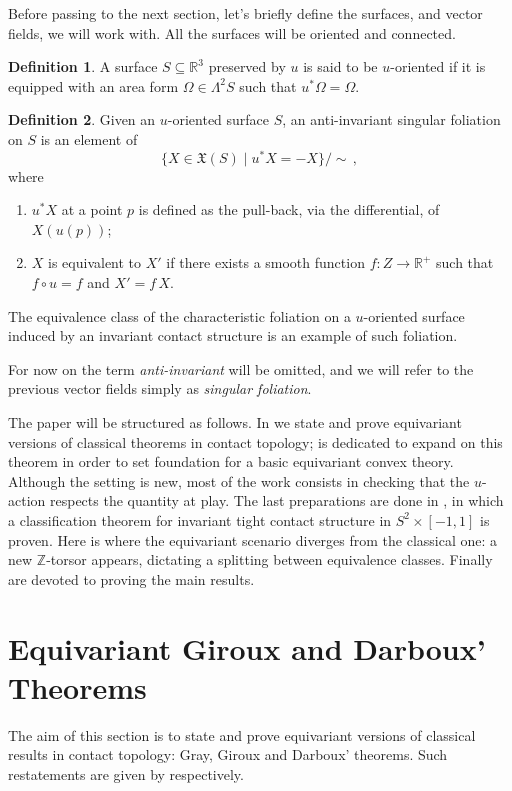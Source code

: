 \documentclass[a4paper, 11pt]{amsart}
\theoremstyle{plain}
\theoremstyle{definition}
\newtheorem*{definsn}{Definition}
\newcommand{\R}{\mathbb{R}}
\newcommand{\XX}{\mathfrak{X}}
\newcommand{\Z}{\mathbb{Z}}
\begin{document}
Before passing to the next section, let's briefly define the surfaces, and vector fields, we will work with. All the surfaces will be oriented and connected.
\begin{definsn}
	A surface $S \subseteq \R^3$ preserved by $u$ is said to be $u$-oriented if it is equipped with an area form $\Omega \in \Lambda^2S$ such that $u^*\Omega = \Omega$.
\end{definsn}
\begin{definsn}
	Given an $u$-oriented surface $S$, an anti-invariant singular foliation on $S$ is an element of
	\[
		\{X \in \XX(S) \mid u^*X = -X\}/\sim\,,
	\]
	where
	\begin{enumerate}
		\item $u^*X$ at a point $p$ is defined as the pull-back, via the differential, of $X(u(p))$;
		\item $X$ is equivalent to $X'$ if there exists a smooth function $f \colon Z \to \R^+$ such that $f \circ u = f$ and $X' = f\,X$.
	\end{enumerate}
\end{definsn}
The equivalence class of the characteristic foliation on a $u$-oriented surface induced by an invariant contact structure is an example of such foliation.

For now on the term \emph{anti-invariant} will be omitted, and we will refer to the previous vector fields simply as \emph{singular foliation}.


The paper will be structured as follows. In  we state and prove equivariant versions of classical theorems in contact topology;  is dedicated to expand on this theorem in order to set foundation for a basic equivariant convex theory. Although the setting is new, most of the work consists in checking that the $u$-action respects the quantity at play. The last preparations are done in , in which a classification theorem for invariant tight contact structure in $S^2 \times [-1,1]$ is proven. Here is where the equivariant scenario diverges from the classical one: a new $\Z$-torsor appears, dictating a splitting between equivalence classes. Finally  are devoted to proving the main results.
\section{Equivariant Giroux and Darboux' Theorems}\label{sec:EThm}
The aim of this section is to state and prove equivariant versions of classical results in contact topology: Gray, Giroux and Darboux' theorems. Such restatements are given by  respectively.
\end{document}
